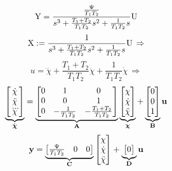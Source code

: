 \begin{equation}
	\mathrm{Y} = \frac{\frac{\Psi}{T_1T_2}}{s^3+\frac{T_1+T_2}{T_1T_2}s^2+\frac{1}{T_1T_2}s}\mathrm{U}
\end{equation}
\begin{equation}
	\mathrm{X} := \frac{1}{s^3+\frac{T_1+T_2}{T_1T_2}s^2+\frac{1}{T_1T_2}s}\mathrm{U}\,\Rightarrow
\end{equation}
\begin{equation}
	u = \dddot{\chi} + \frac{T_1+T_2}{T_1T_2}\ddot{\chi} + \frac{1}{T_1T_2}\dot{\chi}\,\Rightarrow
\end{equation}
\begin{equation}
	\underbrace{\begin{bmatrix}\dot{\chi}\\\ddot{\chi}\\\dddot{\chi}\end{bmatrix}}_{\dot{\boldsymbol{\mathrm{\chi}} }}
	= \underbrace{\begin{bmatrix}0&1&0\\0&0&1\\0&-\frac{1}{T_1T_2}&-\frac{T_1+T_2}{T_1T_2}\end{bmatrix}}_{\boldsymbol{\mathrm{A}}}
	\underbrace{\begin{bmatrix}\chi\\\dot{\chi}\\\ddot{\chi}\end{bmatrix}}_{\boldsymbol{\mathrm{\chi}}}
	+ \underbrace{\begin{bmatrix}0\\0\\1\end{bmatrix}}_{\boldsymbol{\mathrm{B}}}\boldsymbol{\mathrm{u}}
\end{equation}
\begin{equation}
	\boldsymbol{\mathrm{y}} = \underbrace{\begin{bmatrix}\frac{\Psi}{T_1T_2}&0&0\end{bmatrix}}_{\boldsymbol{\mathrm{C}}}\begin{bmatrix}\chi\\\dot{\chi}\\\ddot{\chi}\end{bmatrix} + \underbrace{\begin{bmatrix}0\end{bmatrix}}_{\boldsymbol{\mathrm{D}}}\boldsymbol{\mathrm{u}}
\end{equation}

